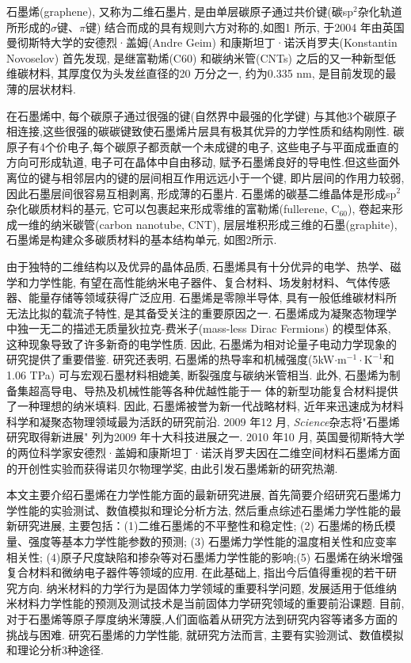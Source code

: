 \documentclass{APS}
\begin{document}
\begin{bicol}
石墨烯(graphene), 又称为二维石墨片, 是由单层碳原子通过共价键(碳sp$^2$杂化轨道所形成的$\sigma$键、$\pi$键) 结合而成的具有规则六方对称的,如图1 所示, 于2004 年由英国曼彻斯特大学的安德烈·盖姆(Andre Geim) 和康斯坦丁·诺沃肖罗夫(Konstantin Novoselov) 首先发现, 是继富勒烯(C60) 和碳纳米管(CNTs) 之后的又一种新型低维碳材料, 其厚度仅为头发丝直径的20 万分之一, 约为0.335 nm, 是目前发现的最薄的层状材料.

在石墨烯中, 每个碳原子通过很强的键(自然界中最强的化学键) 与其他3个碳原子相连接,这些很强的碳碳键致使石墨烯片层具有极其优异的力学性质和结构刚性. 碳原子有4个价电子,每个碳原子都贡献一个未成键的电子, 这些电子与平面成垂直的方向可形成轨道, 电子可在晶体中自由移动, 赋予石墨烯良好的导电性.但这些面外离位的键与相邻层内的键的层间相互作用远远小于一个键, 即片层间的作用力较弱, 因此石墨层间很容易互相剥离, 形成薄的石墨片. 石墨烯的碳基二维晶体是形成sp$^2$ 杂化碳质材料的基元, 它可以包裹起来形成零维的富勒烯(fullerene, C$_{60}$), 卷起来形成一维的纳米碳管(carbon nanotube, CNT), 层层堆积形成三维的石墨(graphite), 石墨烯是构建众多碳质材料的基本结构单元, 如图2所示.

由于独特的二维结构以及优异的晶体品质, 石墨烯具有十分优异的电学、热学、磁学和力学性能, 有望在高性能纳米电子器件、复合材料、场发射材料、气体传感器、能量存储等领域获得广泛应用. 石墨烯是零隙半导体, 具有一般低维碳材料所无法比拟的载流子特性, 是其备受关注的重要原因之一. 石墨烯成为凝聚态物理学中独一无二的描述无质量狄拉克-费米子(mass-less Dirac Fermions) 的模型体系, 这种现象导致了许多新奇的电学性质. 因此, 石墨烯为相对论量子电动力学现象的研究提供了重要借鉴. 研究还表明, 石墨烯的热导率和机械强度(5kW$\cdot\mathrm{m}^{-1}\cdot\mathrm{K}^{-1}$和1.06 TPa) 可与宏观石墨材料相媲美, 断裂强度与碳纳米管相当. 此外, 石墨烯为制备集超高导电、导热及机械性能等各种优越性能于一
体的新型功能复合材料提供了一种理想的纳米填料. 因此, 石墨烯被誉为新一代战略材料, 近年来迅速成为材料科学和凝聚态物理领域最为活跃的研究前沿. 2009 年12 月, \textsl{Science}杂志将"石墨烯研究取得新进展" 列为2009 年十大科技进展之一. 2010 年10 月, 英国曼彻斯特大学的两位科学家安德烈·盖姆和康斯坦丁·诺沃肖罗夫因在二维空间材料石墨烯方面的开创性实验而获得诺贝尔物理学奖, 由此引发石墨烯新的研究热潮.

本文主要介绍石墨烯在力学性能方面的最新研究进展, 首先简要介绍研究石墨烯力学性能的实验测试、数值模拟和理论分析方法, 然后重点综述石墨烯力学性能的最新研究进展, 主要包括：(1)二维石墨烯的不平整性和稳定性; (2) 石墨烯的杨氏模量、强度等基本力学性能参数的预测; (3) 石墨烯力学性能的温度相关性和应变率相关性; (4)原子尺度缺陷和掺杂等对石墨烯力学性能的影响;(5) 石墨烯在纳米增强复合材料和微纳电子器件等领域的应用. 在此基础上, 指出今后值得重视的若干研究方向.
纳米材料的力学行为是固体力学领域的重要科学问题, 发展适用于低维纳米材料力学性能的预测及测试技术是当前固体力学研究领域的重要前沿课题. 目前, 对于石墨烯等原子厚度纳米薄膜,人们面临着从研究方法到研究内容等诸多方面的挑战与困难. 研究石墨烯的力学性能, 就研究方法而言, 主要有实验测试、数值模拟和理论分析3种途径.


\end{bicol}
\end{document}
